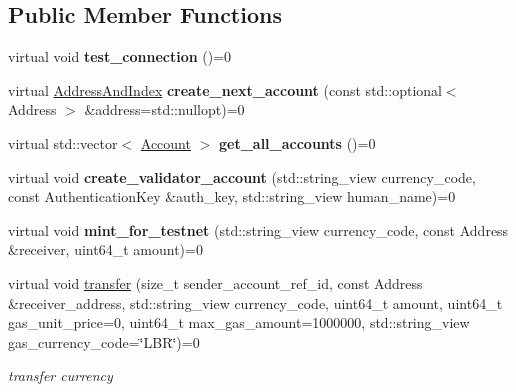\subsection*{Public Member Functions}
\begin{DoxyCompactItemize}
\item 
\mbox{\label{classviolas_1_1_client_ae2a83172b93a647ce1261cbc049379f1}} 
virtual void {\bfseries test\+\_\+connection} ()=0
\item 
\mbox{\label{classviolas_1_1_client_aee0abed2c8162e12f4a2e7f7445176cd}} 
virtual \hyperlink{structviolas_1_1_address_and_index}{Address\+And\+Index} {\bfseries create\+\_\+next\+\_\+account} (const std\+::optional$<$ Address $>$ \&address=std\+::nullopt)=0
\item 
\mbox{\label{classviolas_1_1_client_a84b107f00acefdf7c66b1ebec3e5ff35}} 
virtual std\+::vector$<$ \hyperlink{structviolas_1_1_account}{Account} $>$ {\bfseries get\+\_\+all\+\_\+accounts} ()=0
\item 
\mbox{\label{classviolas_1_1_client_affd9f58580ee202f1e94edef655f8978}} 
virtual void {\bfseries create\+\_\+validator\+\_\+account} (std\+::string\+\_\+view currency\+\_\+code, const Authentication\+Key \&auth\+\_\+key, std\+::string\+\_\+view human\+\_\+name)=0
\item 
\mbox{\label{classviolas_1_1_client_a18e71a388b3893dd0bd80169899c2901}} 
virtual void {\bfseries mint\+\_\+for\+\_\+testnet} (std\+::string\+\_\+view currency\+\_\+code, const Address \&receiver, uint64\+\_\+t amount)=0
\item 
virtual void \hyperlink{classviolas_1_1_client_a03f34478845c0a740cc42fa7ac97560a}{transfer} (size\+\_\+t sender\+\_\+account\+\_\+ref\+\_\+id, const Address \&receiver\+\_\+address, std\+::string\+\_\+view currency\+\_\+code, uint64\+\_\+t amount, uint64\+\_\+t gas\+\_\+unit\+\_\+price=0, uint64\+\_\+t max\+\_\+gas\+\_\+amount=1000000, std\+::string\+\_\+view gas\+\_\+currency\+\_\+code=\char`\"{}L\+BR\char`\"{})=0
\begin{DoxyCompactList}\small\item\em transfer currency \end{DoxyCompactList}\item 

\end{DoxyCompactItemize}
